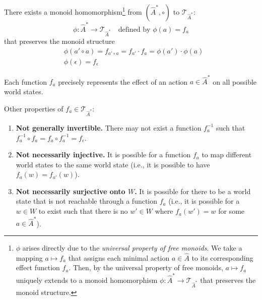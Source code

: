 There exists a monoid homomorphism\footnote{
$\phi$ arises directly due to the \emph{universal property of free monoids}.
We take a mapping $a \mapsto f_{a}$ that assigns each minimal action $a \in \hat{A}$ to its corresponding effect function $f_{a}$.
Then, by the universal property of free monoids, $a \mapsto f_{a}$ uniquely extends to a monoid homomorphism $\phi : \hat{A}^{\ast} \to \mathcal{T}_{\hat{A}^{\ast}}$ that preserves the monoid structure.
} from $(\hat{A}^{\ast}, \circ)$ to $\mathcal{T}_{\hat{A}^{\ast}}$:
\begin{equation}
    \phi : \hat{A}^{\ast} \to \mathcal{T}_{\hat{A}^{\ast}} \quad\text{defined by $\phi(a) = f_{a}$}
\end{equation}
that preserves the monoid structure
\begin{align}
     & \phi(a' \circ a) = f_{a' \circ a} = f_{a'} \cdot f_{a} = \phi(a') \cdot \phi(a) \\
     & \phi(\epsilon) = f_{\epsilon}
\end{align}


Each function $f_{a}$ precisely represents the effect of an action $a \in \hat{A}^{*}$ on all possible world states.

Other properties of $f_{a} \in \mathcal{T}_{\hat{A}^{\ast}}$:
\begin{enumerate}[(1)]
    \item \textbf{Not generally invertible.}
          There may not exist a function $f_{a}^{-1}$ such that $f_{a}^{-1} \circ f_{a} = f_{a} \circ f_{a}^{-1} = f_{\epsilon}$.
    \item \textbf{Not necessarily injective.}
          It is possible for a function $f_{a}$ to map different world states to the same world state (i.e., it is possible to have $f_{a}(w) = f_{a'}(w)$).
    \item \textbf{Not necessarily surjective onto $W$.}
          It is possible for there to be a world state that is not reachable through a function $f_{a}$ (i.e., it is possible for a $w \in W$ to exist such that there is no $w' \in W$ where $f_{a}(w') = w$ for some $a \in \hat{A}^{\ast}$).
\end{enumerate}


